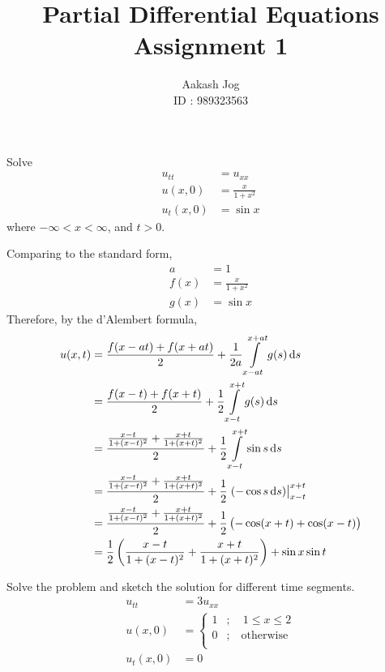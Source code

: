 \documentclass[fleqn, a4paper, 11pt, oneside]{amsart}
\title
[
	PDE : Assignent 1
]
{
	Partial Differential Equations\\
	Assignment 1
}
\author
{
	Aakash Jog\\
	ID : 989323563
}
\date{\formatdate{3}{3}{2016}}
\theoremstyle{definition}
\theoremstyle{theorem}
\begin{document}
\maketitle

\begin{question}
	Solve
	\begin{align*}
		u_{t t}  & = u_{x x}           \\
		u(x,0)   & = \frac{x}{1 + x^2} \\
		u_t(x,0) & = \sin x
	\end{align*}
	where $-\infty < x < \infty$, and $t > 0$.
\end{question}

\begin{solution}
	Comparing to the standard form,
	\begin{align*}
		a    & = 1                 \\
		f(x) & = \frac{x}{1 + x^2} \\
		g(x) & = \sin x
	\end{align*}
	Therefore, by the d'Alembert formula,
	\begin{align*}
		u(x,t) & = \frac{f(x - a t) + f(x + a t)}{2} + \frac{1}{2 a} \int\limits_{x - a t}^{x + a t} g(s) \dif s                                                  \\
                       & = \frac{f(x - t) + f(x + t)}{2} + \frac{1}{2} \int\limits_{x - t}^{x + t} g(s) \dif s                                                            \\
                       & = \frac{\frac{x - t}{1 + (x - t)^2} + \frac{x + t}{1 + (x + t)^2}}{2} + \frac{1}{2} \int\limits_{x - t}^{x + t} \sin s \dif s                    \\
                       & = \frac{\frac{x - t}{1 + (x - t)^2} + \frac{x + t}{1 + (x + t)^2}}{2} + \frac{1}{2} \left. \left( -\cos s \dif s \right) \right|_{x - t}^{x + t} \\
                       & = \frac{\frac{x - t}{1 + (x - t)^2} + \frac{x + t}{1 + (x + t)^2}}{2} + \frac{1}{2} \left( -\cos(x + t) + \cos(x - t) \right)                    \\
                       & = \frac{1}{2} \left( \frac{x - t}{1 + (x - t)^2} + \frac{x + t}{1 + (x + t)^2} \right) + \sin x \sin t
	\end{align*}
\end{solution}

\begin{question}
	Solve the problem and sketch the solution for different time segments.
	\begin{align*}
		u_{t t} &= 3 u_{x x}\\
		u(x,0) &=
			\begin{cases}
				1 & ;\quad 1 \le x \le 2    \\
				0 & ;\quad \text{otherwise} \\
			\end{cases}\\
		u_t(x,0) &= 0
	\end{align*}
\end{question}
\end{document}
